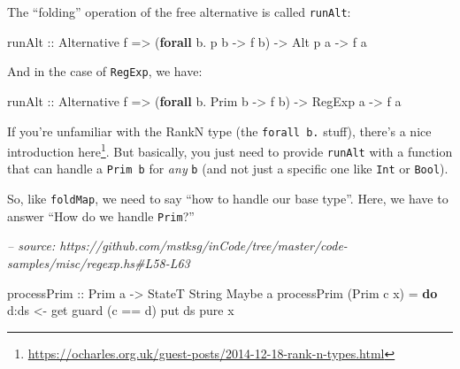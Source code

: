 \documentclass[]{article}
\newenvironment{Shaded}{}{}
\newcommand{\CommentTok}[1]{\textcolor[rgb]{0.38,0.63,0.69}{\textit{#1}}}
\newcommand{\DataTypeTok}[1]{\textcolor[rgb]{0.56,0.13,0.00}{#1}}
\newcommand{\FunctionTok}[1]{\textcolor[rgb]{0.02,0.16,0.49}{#1}}
\newcommand{\KeywordTok}[1]{\textcolor[rgb]{0.00,0.44,0.13}{\textbf{#1}}}
\newcommand{\NormalTok}[1]{#1}
\newcommand{\OtherTok}[1]{\textcolor[rgb]{0.00,0.44,0.13}{#1}}
\renewcommand{\href}[2]{#2\footnote{\url{#1}}}
\begin{document}
The ``folding'' operation of the free alternative is called \texttt{runAlt}:

\begin{Shaded}
\begin{Highlighting}[]
\OtherTok{runAlt ::} \DataTypeTok{Alternative}\NormalTok{ f}
       \OtherTok{=>}\NormalTok{ (}\KeywordTok{forall}\NormalTok{ b}\FunctionTok{.}\NormalTok{ p b }\OtherTok{->}\NormalTok{ f b)}
       \OtherTok{->} \DataTypeTok{Alt}\NormalTok{ p a}
       \OtherTok{->}\NormalTok{ f a}
\end{Highlighting}
\end{Shaded}

And in the case of \texttt{RegExp}, we have:

\begin{Shaded}
\begin{Highlighting}[]
\OtherTok{runAlt ::} \DataTypeTok{Alternative}\NormalTok{ f}
       \OtherTok{=>}\NormalTok{ (}\KeywordTok{forall}\NormalTok{ b}\FunctionTok{.} \DataTypeTok{Prim}\NormalTok{ b }\OtherTok{->}\NormalTok{ f b)}
       \OtherTok{->} \DataTypeTok{RegExp}\NormalTok{ a}
       \OtherTok{->}\NormalTok{ f a}
\end{Highlighting}
\end{Shaded}

If you're unfamiliar with the RankN type (the \texttt{forall\ b.} stuff),
there's a
\href{https://ocharles.org.uk/guest-posts/2014-12-18-rank-n-types.html}{nice
introduction here}. But basically, you just need to provide \texttt{runAlt} with
a function that can handle a \texttt{Prim\ b} for \emph{any} \texttt{b} (and not
just a specific one like \texttt{Int} or \texttt{Bool}).

So, like \texttt{foldMap}, we need to say ``how to handle our base type''. Here,
we have to answer ``How do we handle \texttt{Prim}?''

\begin{Shaded}
\begin{Highlighting}[]
\CommentTok{-- source: https://github.com/mstksg/inCode/tree/master/code-samples/misc/regexp.hs#L58-L63}

\OtherTok{processPrim ::} \DataTypeTok{Prim}\NormalTok{ a }\OtherTok{->} \DataTypeTok{StateT} \DataTypeTok{String} \DataTypeTok{Maybe}\NormalTok{ a}
\NormalTok{processPrim (}\DataTypeTok{Prim}\NormalTok{ c x) }\FunctionTok{=} \KeywordTok{do}
\NormalTok{    d}\FunctionTok{:}\NormalTok{ds }\OtherTok{<-}\NormalTok{ get}
\NormalTok{    guard (c }\FunctionTok{==}\NormalTok{ d)}
\NormalTok{    put ds}
    \FunctionTok{pure}\NormalTok{ x}
\end{Highlighting}
\end{Shaded}
\end{document}
